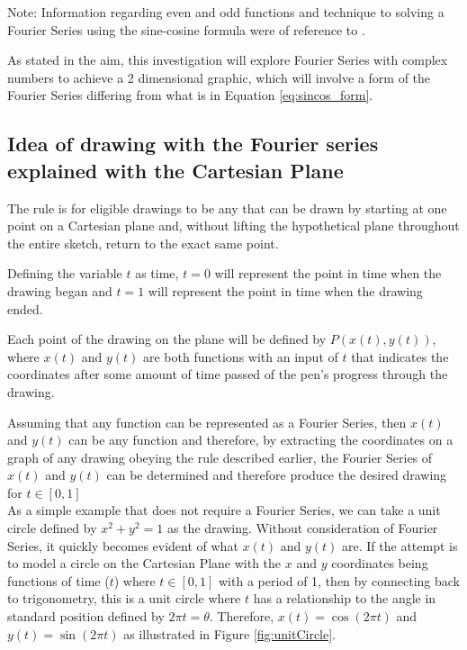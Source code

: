 \documentclass[letterpaper, 12pt]{article}
\begin{document}
Note: Information regarding even and odd functions and technique
to solving a Fourier Series using the sine-cosine formula
were of reference to \cite{tisdellHowComputeFourier2009}.

As stated in the aim, this investigation will explore Fourier Series
with complex numbers to achieve a 2 dimensional graphic, which will involve
a form of the Fourier Series differing from what is in Equation \ref*{eq:sincos_form}.

\subsection{Idea of drawing with the Fourier series explained with the Cartesian Plane} \label{sec:cartplane}

The rule is for eligible drawings to be any that can be drawn by starting at one point
on a Cartesian plane and, without lifting the hypothetical plane throughout the entire
sketch, return to the exact same point.

Defining the variable \(t\) as time, \(t = 0\) will represent the point in time
when the drawing began and \(t = 1\) will represent the point in time when
the drawing ended.

Each point of the drawing on the plane will be defined by \(P(x(t), y(t))\),
where \(x(t)\) and \(y(t)\) are both functions with an input of \(t\) that
indicates the coordinates after some amount of time passed of the pen's progress
through the drawing.

Assuming that any function can be represented as a Fourier Series, then
\(x(t)\) and \(y(t)\) can be any function and therefore, by extracting
the coordinates on a graph of any drawing obeying the rule described earlier,
the Fourier Series of \(x(t)\) and \(y(t)\) can be determined and therefore
produce the desired drawing for \(t\in [0,1]\)
\\

As a simple example that does not require a Fourier Series,
we can take a unit circle defined by \( x^2 + y^2 = 1 \) as the drawing.
Without consideration of Fourier Series,
it quickly becomes evident of what \(x(t)\) and \(y(t)\) are.
If the attempt is to model a circle on the Cartesian Plane
with the \(x\) and \(y\) coordinates being functions of time
(\(t\)) where \(t\in [0,1]\) with a period of 1,
then by connecting back to trigonometry, this is a unit circle
where \(t\) has a relationship to the angle in standard position
defined by \(2\pi t = \theta\). Therefore,
\(x(t) = \cos(2\pi t)\) and \(y(t) = \sin(2\pi t)\)
as illustrated in Figure \ref*{fig:unitCircle}.
\end{document}

